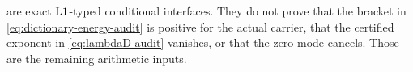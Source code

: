 \begin{remark}[Status]
\label{rem:tpc81-conditional-status}
are exact \(\mathrm{L1}\)-typed conditional interfaces.  They do not prove
that the
bracket in \eqref{eq:dictionary-energy-audit} is positive for the
actual carrier, that the certified exponent in
\eqref{eq:lambdaD-audit} vanishes, or that the zero mode cancels.
Those are the remaining arithmetic inputs.
\end{remark}
